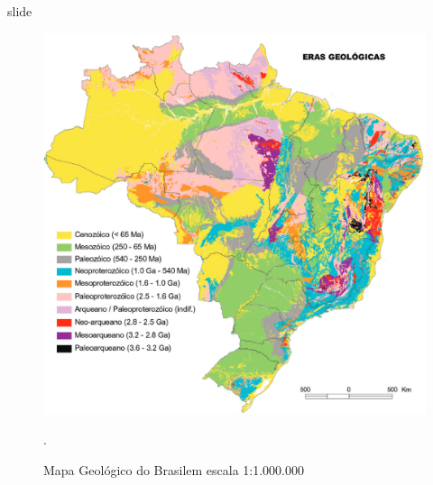 \documentclass[ucs,8pt]{beamer}
\begin{document}
\begin{frame}{slide}


\begin{figure}[H]
  \centering
  \includegraphics[height=.70\textheight]{tectonico_brasil} 
  \caption{Mapa Geológico do Brasil\footnotemark em escala 1:1.000.000}.
  \label{fig:br_tec} 
\end{figure}


\end{frame}
\end{document}
